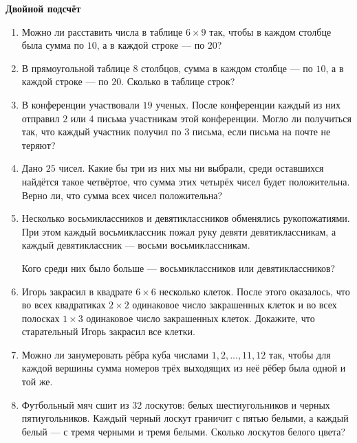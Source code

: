 \documentclass{article}
\begin{document}
\large
	
	
\begin{center}
	\textbf{Двойной подсчёт}
\end{center}



\begin{enumerate}[label*=\protect\fbox{\arabic{enumi}}]

\item Можно ли расставить числа в таблице $6 \times 9$ так, чтобы в каждом столбце была сумма по $10$, а в каждой строке — по $20$?

\item В прямоугольной таблице $8$ столбцов, сумма в каждом столбце — по $10$, а в каждой строке — по $20$. Сколько в таблице строк?

\item В конференции участвовали $19$ ученых. После конференции каждый из них отправил $2$ или $4$ письма участникам этой конференции. Могло ли получиться так, что каждый участник получил по $3$ письма, если письма на почте не теряют?

\item Дано $25$ чисел. Какие бы три из них мы ни выбрали, среди оставшихся найдётся такое четвёртое, что сумма этих четырёх чисел будет положительна. Верно ли, что сумма всех чисел положительна?

\item Несколько восьмиклассников и девятиклассников обменялись рукопожатиями. При этом каждый восьмиклассник пожал руку девяти девятиклассникам, а каждый девятиклассник — восьми восьмиклассникам.

Кого среди них было больше — восьмиклассников или девятиклассников?

\item Игорь закрасил в квадрате $6\times6$ несколько клеток. После этого оказалось, что во всех квадратиках $2\times2$ одинаковое число закрашенных клеток и во всех полосках $1\times3$ одинаковое число закрашенных клеток. Докажите, что старательный Игорь закрасил все клетки.

\item Можно ли занумеровать рёбра куба числами $1, 2, ..., 11, 12$ так, чтобы для каждой вершины сумма номеров трёх выходящих из неё рёбер была одной и той же.

\item Футбольный мяч сшит из $32$ лоскутов: белых шестиугольников и черных пятиугольников. Каждый черный лоскут граничит с пятью белыми, а каждый белый — с тремя черными и тремя белыми. Сколько лоскутов белого цвета?


\end{enumerate}
\end{document}
